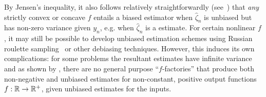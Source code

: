 By Jensen's inequality, it also follows relatively straightforwardly (see~\cite{rainforth2017pitfalls}) 
that \emph{any} strictly convex or concave $f$  entails a biased estimator 
when $\hat{\zeta}_n$ is unbiased but has non-zero variance given $y_n$, e.g.
when $\hat{\zeta}_n$ is a \mc estimate.
For certain nonlinear $f$, it may still be possible to develop unbiased estimation
schemes using Russian roulette sampling~\citep{lyne2015russian} or other debiasing techniques.  
However, this induces its own complications: for some problems the resultant estimates
have infinite variance \citep{lyne2015russian} and as shown by \cite{jacob2015nonnegative}, there are 
no general purpose ``$f$-factories'' that produce both non-negative and
unbiased estimates for non-constant, positive output functions $f : \mathbb{R} \rightarrow \mathbb{R}^+$,
given unbiased estimates for the inputs.

